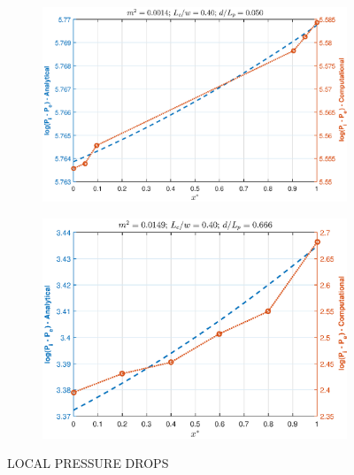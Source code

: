 \documentclass[twocolumn,10pt,cleanfoot]{ihmtc}
\begin{document}
\begin{figure}
\centering
   \begin{subfigure}[b]{0.55\textwidth}
   \includegraphics[height=0.55\linewidth,width=0.90\linewidth]{pres_a.eps}
   \caption{}
   \label{pres_a} 
\end{subfigure}
%
   \begin{subfigure}[b]{0.55\textwidth}
   \includegraphics[height=0.55\linewidth,width=0.90\linewidth]{pres_b.eps}
   \caption{}
   \label{pres_b} 
\end{subfigure}
%
%
%
\vspace{-2.5em}
\caption{LOCAL PRESSURE DROPS}
\vspace{-3.5em}
\end{figure}
%
%
\end{document}
